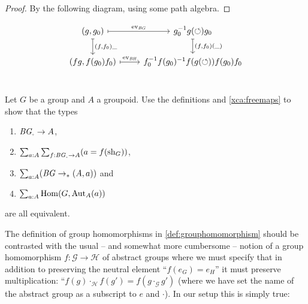 \begin{proof}
By the following diagram, using some path algebra.
\end{proof}

\[
\begin{tikzcd} 
(g,g_0) \arrow[r, mapsto, "\ev_{\BG}"] \arrow[d, mapsto, "{(f,f_0)\_}"] & 
g_0^{-1} g(\Sloop) g_0 \arrow[d, mapsto, "{(f,f_0)(\_)}"]\\
(fg,f(g_0)f_0) \arrow[r, mapsto, "\ev_{\BH}"] & f_0^{-1} f(g_0)^{-1} f(g(\Sloop)) f(g_0) f_0 \\
\end{tikzcd}
\]


\begin{xca}\label{xca:BGtotype}
  Let $G$ be a group and $A$ a groupoid.  Use the definitions and
  \cref{xca:freemaps} to show that the types
  \begin{enumerate}
  \item $\BG_\div\to A$, 
  \item $\sum_{a:A}\sum_{f:\BG_\div \to A}(a=f(\sh_G))$, 
  \item $\sum_{a:A}(\mathit{B}\mathit{G}\to_\ast(A,a))$ and 
  \item $\sum_{a:A}\Hom(G,\aut_A(a))$
  \end{enumerate}
 are all equivalent.
\end{xca}

The definition of group homomorphisms in \cref{def:grouphomomorphism} should be contrasted with the usual -- and somewhat more cumbersome -- notion of a group homomorphism $f\colon \mathcal G\to \mathcal H$ of abstract groups where we must specify that in addition to preserving the neutral element ``$f(e_G)=e_H$'' it must preserve multiplication: ``$f(g)\cdot_{\mathcal H} f(g')=f(g\cdot_{\mathcal G} g')$ (where we have set the name of the abstract group as a subscript to $e$ and $\cdot$).  In our setup this is simply true:

